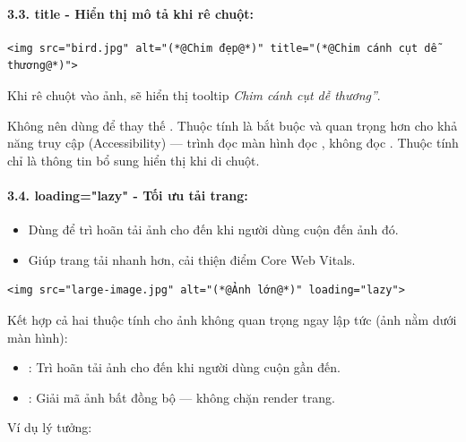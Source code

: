 \paragraph{3.3. title - Hiển thị mô tả khi rê chuột:}
\begin{codeWindow}
\begin{lstlisting}[language=HTML5]
<img src="bird.jpg" alt="(*@Chim đẹp@*)" title="(*@Chim cánh cụt dễ thương@*)">
\end{lstlisting}
\end{codeWindow}

Khi rê chuột vào ảnh, sẽ hiển thị tooltip \textit{\codeinline{}Chim cánh cụt dễ thương''}.

\begin{noteBox}
Không nên dùng  để thay thế . Thuộc tính  là bắt buộc và quan trọng hơn cho khả năng truy cập (Accessibility) — trình đọc màn hình đọc , không đọc . Thuộc tính  chỉ là thông tin bổ sung hiển thị khi di chuột.
\end{noteBox}

\paragraph{3.4. loading="lazy" - Tối ưu tải trang:}
\begin{itemize}[leftmargin=1.5em, itemsep=2pt, parsep=0pt]
    \item Dùng để trì hoãn tải ảnh cho đến khi người dùng cuộn đến ảnh đó.
    \item Giúp trang tải nhanh hơn, cải thiện điểm Core Web Vitals.
\end{itemize}

\begin{codeWindow}
\begin{lstlisting}[language=HTML5]
<img src="large-image.jpg" alt="(*@Ảnh lớn@*)" loading="lazy">
\end{lstlisting}
\end{codeWindow}

\begin{tipBox}[Kết Hợp loading="lazy" Và decoding="async" Để Tối Ưu Tối Đa]
Kết hợp cả hai thuộc tính cho ảnh không quan trọng ngay lập tức (ảnh nằm dưới màn hình):
\begin{itemize}[leftmargin=1.5em, itemsep=2pt, parsep=0pt]
    \item {}: Trì hoãn tải ảnh cho đến khi người dùng cuộn gần đến.
    \item {}: Giải mã ảnh bất đồng bộ — không chặn render trang.
\end{itemize}
Ví dụ lý tưởng: 
\end{tipBox}

